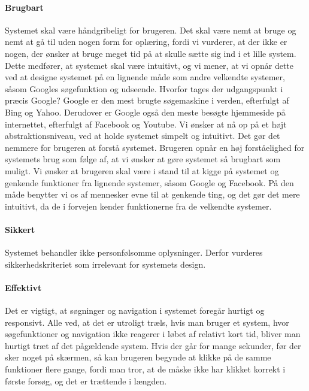 \paragraph{Brugbart} Systemet skal være håndgribeligt for brugeren. Det skal være nemt at bruge og nemt at gå til uden nogen form for oplæring, fordi vi vurderer, at der ikke er nogen, der ønsker at bruge meget tid på at skulle sætte sig ind i et lille system. Dette medfører, at systemet skal være intuitivt, og vi mener,  at vi opnår dette ved at designe systemet på en lignende måde som andre velkendte systemer, såsom Googles søgefunktion og udseende. Hvorfor tages der udgangspunkt i præcis Google? Google er den mest brugte søgemaskine i verden, efterfulgt af Bing og Yahoo.\cite{googlesoeg}\cite{ebizmba} Derudover er Google også den meste besøgte hjemmeside på internettet, efterfulgt af Facebook og Youtube.\cite{alexadk} Vi ønsker at nå op på et højt abstraktionsniveau, ved at holde systemet simpelt og intuitivt. Det gør det nemmere for brugeren at forstå systemet. Brugeren opnår en høj forståelighed for systemets brug som følge af, at vi ønsker at gøre systemet så brugbart som muligt. Vi ønsker at brugeren skal være i stand til at kigge på systemet og genkende funktioner fra lignende systemer, såsom Google og Facebook. På den måde benytter vi os af mennesker evne til at genkende ting, og det gør det mere intuitivt, da de i forvejen kender funktionerne fra de velkendte systemer.

\paragraph{Sikkert} Systemet behandler ikke personfølsomme oplysninger. Derfor vurderes sikkerhedskriteriet som irrelevant for systemets design.

\paragraph{Effektivt} Det er vigtigt, at søgninger og navigation i systemet foregår hurtigt og responsivt. Alle ved, at det er utroligt træls, hvis man bruger et system, hvor søgefunktioner og navigation ikke reagerer i løbet af relativt kort tid, bliver man hurtigt træt af det pågældende system. Hvis der går for mange sekunder, før der sker noget på skærmen, så kan brugeren begynde at klikke på de samme funktioner flere gange, fordi man tror, at de måske ikke har klikket korrekt i første forsøg, og det er trættende i længden. 

